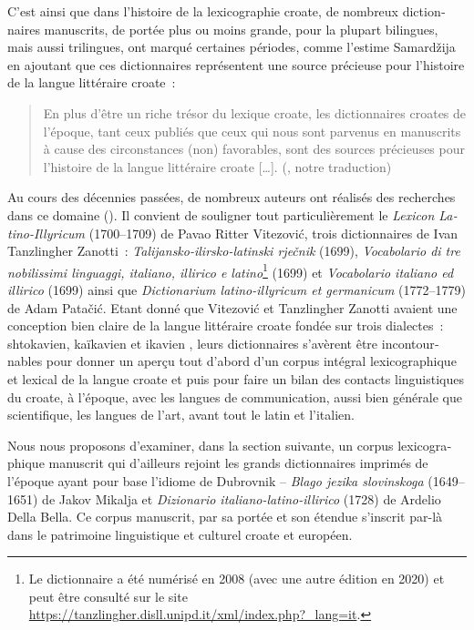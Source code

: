 \documentclass[output=paper,colorlinks,citecolor=brown,arabicfont,chinesefont,booklanguage=french]{langscibook}
\begin{document}
\begin{otherlanguage}{french}
C’est ainsi que dans l’histoire de la lexicographie croate, de nombreux dictionnaires manuscrits, de portée plus ou moins grande, pour la plupart bilingues, mais aussi trilingues, ont marqué certaines périodes, comme l’estime Samardžija en ajoutant que ces dictionnaires représentent une source précieuse pour l’histoire de la langue littéraire croate~: 

\begin{quote}
En plus d’être un riche trésor du lexique croate, les dictionnaires croates de l’époque, tant ceux publiés que ceux qui nous sont parvenus en manuscrits à cause des circonstances (non) favorables, sont des sources précieuses pour l’histoire de la langue littéraire croate […]. (\citet[453]{Samardzija2013}, notre traduction) 
\end{quote}
 
Au cours des décennies passées, de nombreux auteurs ont réalisés des recherches dans ce domaine (\citealt{Gabric_bagaric1996,Gabric_bagaric1998,Gabric_bagaric2000,Gabric_bagaric2002, Vajs2003, Voncina1992,Voncina2003, Sironic_bonefacic1992, Putanec1991, Putanec2000, Mestrovic1995, Horvat1990}). Il convient de souligner tout particulièrement le \emph{Lexicon Latino-Illyricum} (1700--1709) de Pavao Ritter Vitezović, trois dictionnaires de Ivan Tanzlingher Zanotti~: \emph{Talijansko-ilirsko-latinski rječnik} (1699), \emph{Vocabolario di tre nobilissimi linguaggi, italiano, illirico e latino}\footnote{Le dictionnaire a été numérisé en 2008 (avec une autre édition en 2020) et peut être consulté sur le site \url{https://tanzlingher.disll.unipd.it/xml/index.php?\_lang=it}.} (1699) et \emph{Vocabolario italiano ed illirico} (1699) ainsi que \emph{Dictionarium latino-illyricum et germanicum} (1772--1779) de Adam Patačić. Etant donné que Vitezović et Tanzlingher Zanotti avaient une conception bien claire de la langue littéraire croate fondée sur trois dialectes~: shtokavien, kaïkavien et ikavien \citep[47--48]{Samardzija2019}, leurs dictionnaires s’avèrent être incontournables pour donner un aperçu tout d’abord d’un corpus intégral lexicographique et lexical de la langue croate et puis pour faire un bilan des contacts linguistiques du croate, à l’époque, avec les langues de communication, aussi bien générale que scientifique, les langues de l’art, avant tout le latin et l’italien.

Nous nous proposons d’examiner, dans la section suivante, un corpus lexicographique manuscrit qui d’ailleurs rejoint les grands dictionnaires imprimés de l’époque ayant pour base l’idiome de Dubrovnik – \emph{Blago jezika slovinskoga} (1649--1651) de Jakov Mikalja et \emph{Dizionario italiano-latino-illirico} (1728) de Ardelio Della Bella. Ce corpus manuscrit, par sa portée et son étendue s’inscrit par-là dans le patrimoine linguistique et culturel croate et européen. 


\end{otherlanguage}
\end{document}
